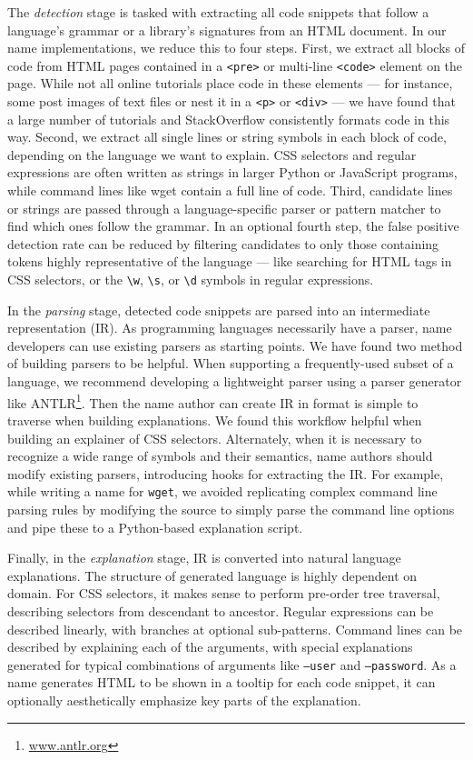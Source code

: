 The \emph{detection} stage is tasked with extracting all code snippets that follow a language's grammar or a library's signatures from an HTML document.
In our \gls{name} implementations, we reduce this to four steps.
First, we extract all blocks of code from HTML pages contained in a \texttt{<pre>} or multi-line \texttt{<code>} element on the page.
While not all online tutorials place code in these elements --- for instance, some post images of text files or nest it in a \texttt{<p>} or \texttt{<div>} --- we have found that a large number of tutorials and StackOverflow consistently formats code in this way.
Second, we extract all single lines or string symbols in each block of code, depending on the language we want to explain.
CSS selectors and regular expressions are often written as strings in larger Python or JavaScript programs, while command lines like wget contain a full line of code.
Third, candidate lines or strings are passed through a language-specific parser or pattern matcher to find which ones follow the grammar.
In an optional fourth step, the false positive detection rate can be reduced by filtering candidates to only those containing tokens highly representative of the language --- like searching for HTML tags in CSS selectors, or the \texttt{\textbackslash{}w}, \texttt{\textbackslash{}s}, or \texttt{\textbackslash{}d} symbols in regular expressions.

In the \emph{parsing} stage, detected code snippets are parsed into an intermediate representation (IR). 
As programming languages necessarily have a parser, \gls{name} developers can use existing parsers as starting points.
We have found two method of building parsers to be helpful.
When supporting a frequently-used subset of a language, we recommend developing a lightweight parser using a parser generator like ANTLR\footnote{\url{www.antlr.org}}.
Then the \gls{name} author can create IR in format is simple to traverse when building explanations.
We found this workflow helpful when building an explainer of CSS selectors.
Alternately, when it is necessary to recognize a wide range of symbols and their semantics, \gls{name} authors should modify existing parsers, introducing hooks for extracting the IR. 
For example, while writing a \gls{name} for \texttt{wget}, we avoided replicating complex command line parsing rules by modifying the source to simply parse the command line options and pipe these to a Python-based explanation script.

Finally, in the \emph{explanation} stage, IR is converted into natural language explanations.
The structure of generated language is highly dependent on domain.
For CSS selectors, it makes sense to perform pre-order tree traversal, describing selectors from descendant to ancestor.
Regular expressions can be described linearly, with branches at optional sub-patterns.
Command lines can be described by explaining each of the arguments, with special explanations generated for typical combinations of arguments like \texttt{--user} and \texttt{--password}.
As a \gls{name} generates HTML to be shown in a tooltip for each code snippet, it can optionally aesthetically emphasize key parts of the explanation.
